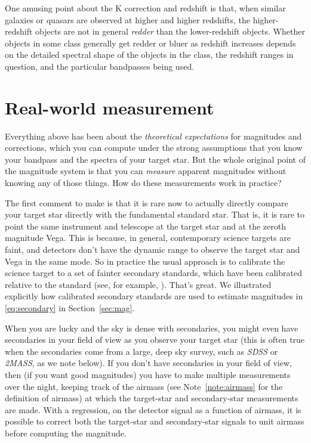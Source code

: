\documentclass[10pt]{article}
\newcommand{\sectionname}{Section}
\newcommand{\secref}[1]{\sectionname~\ref{#1}}
\newcommand{\noteref}[1]{Note~\ref{#1}}
\begin{document}
One amusing point about the K correction and redshift is that, when similar galaxies or quasars are observed at higher and higher redshifts, the higher-redshift objects are not in general \emph{redder} than the lower-redshift objects.
Whether objects in some class generally get redder or bluer as redshift increases depends on the detailed spectral shape of the objects in the class, the redshift ranges in question, and the particular bandpasses being used.

\section{Real-world measurement}\label{sec:practice}

Everything above has been about the \emph{theoretical expectations} for magnitudes and corrections, which you can compute under the strong assumptions that you know your bandpass and the spectra of your target star.
But the whole original point of the magnitude system is that you can \emph{measure} apparent magnitudes without knowing any of those things.
How do these measurements work in practice?

The first comment to make is that it is rare now to actually directly compare your target star directly with the fundamental standard star.
That is, it is rare to point the same instrument and telescope at the target star and at the zeroth magnitude Vega.
This is because, in general, contemporary science targets are faint, and detectors don't have the dynamic range to observe the target star and Vega in the same mode.
So in practice the usual approach is to calibrate the science target to a set of fainter secondary standards, which have been calibrated relative to the standard (see, for example, \cite{landolt}).
That's great.
We illustrated explicitly how calibrated secondary standards are used to estimate magnitudes in \eqref{eq:secondary} in \secref{sec:mag}.

When you are lucky and the sky is dense with secondaries, you might even have secondaries in your field of view as you observe your target star (this is often true when the secondaries come from a large, deep sky survey, such as \textsl{SDSS} or \textsl{2MASS}, as we note below).
If you don't have secondaries in your field of view, then (if you want good magnitudes) you have to make multiple measurements over the night, keeping track of the airmass (see \noteref{note:airmass} for the definition of airmass) at which the target-star and secondary-star measurements are made.
With a regression, on the detector signal as a function of airmass, it is possible to correct both the target-star and secondary-star signals to unit airmass before computing the magnitude.
\end{document}
